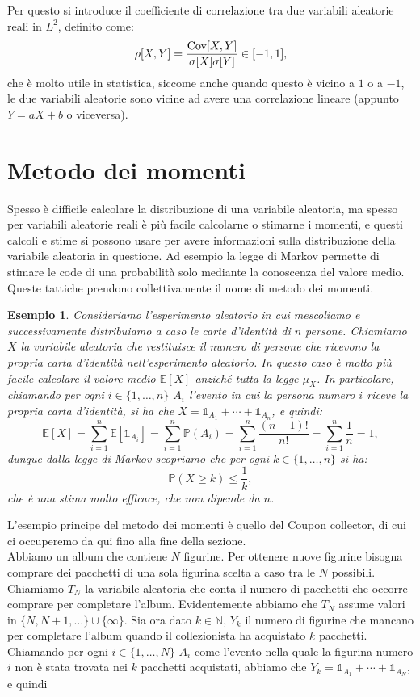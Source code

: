 \documentclass[11pt]{book}
\theoremstyle{Definizione}
\theoremstyle{TeoremaProposizioneLemmaCorollario}
\theoremstyle{OsservazioneNota}
\newtheorem{myes}{Esempio}[section]
\newcommand{\N}{\mathbb{N}}
\renewcommand{\P}{\mathbb{P}}
\newcommand{\E}{\mathbb{E}}
\newcommand{\Cov}{\textup{Cov}}
\newcommand{\uno}[1]{\mathds{1}_{#1}}
\begin{document}
\noindent
Per questo si introduce il coefficiente di correlazione tra due variabili aleatorie reali in $L^2$, definito come:
$$
\rho[X,Y] = \frac{\Cov[X,Y]}{\sigma[X]\sigma[Y]}\in [-1,1],
$$
che è molto utile in statistica, siccome anche quando questo è vicino a $1$ o a $-1$, le due variabili aleatorie sono vicine ad avere una correlazione lineare (appunto $Y = aX+b$ o viceversa).
\section{Metodo dei momenti}
Spesso è difficile calcolare la distribuzione di una variabile aleatoria, ma spesso per variabili aleatorie reali è più facile calcolarne o stimarne i momenti, e questi calcoli e stime si possono usare per avere informazioni sulla distribuzione della variabile aleatoria in questione. Ad esempio la legge di Markov permette di stimare le code di una probabilità solo mediante la conoscenza del valore medio.\\
Queste tattiche prendono collettivamente il nome di metodo dei momenti.
\begin{myes}
Consideriamo l'esperimento aleatorio in cui mescoliamo e successivamente distribuiamo a caso le carte d'identità di $n$ persone. Chiamiamo $X$ la variabile aleatoria che restituisce il numero di persone che ricevono la propria carta d'identità nell'esperimento aleatorio. In questo caso è molto più facile calcolare il valore medio $\E[X]$ anziché tutta la legge $\mu_X$. In particolare, chiamando per ogni $i\in \{1,\dots,n\}$ $A_i$ l'evento in cui la persona numero $i$ riceve la propria carta d'identità, si ha che $X = \uno{A_1}+\cdots+\uno{A_n}$, e quindi:
$$
\E[X] = \sum_{i = 1}^n \E[\uno{A_i}] = \sum_{i = 1}^n \P(A_i) = \sum_{i = 1}^n \frac{(n-1)!}{n!} = \sum_{i = 1}^n \frac{1}{n} = 1,
$$
dunque dalla legge di Markov scopriamo che per ogni $k\in \{1,\dots,n\}$ si ha:
$$
\P(X \geq k) \leq \frac{1}{k},
$$
che è una stima molto efficace, che non dipende da $n$.
\end{myes}
L'esempio principe del metodo dei momenti è quello del Coupon collector, di cui ci occuperemo da qui fino alla fine della sezione.\\
Abbiamo un album che contiene $N$ figurine. Per ottenere nuove figurine bisogna comprare dei pacchetti di una sola figurina scelta a caso tra le $N$ possibili. Chiamiamo $T_N$ la variabile aleatoria che conta il numero di pacchetti che occorre comprare per completare l'album. Evidentemente abbiamo che $T_N$ assume valori in $\{N,N+1,\dots\}\cup \{\infty\}$. Sia ora dato $k\in \N$, $Y_k$ il numero di figurine che mancano per completare l'album quando il collezionista ha acquistato $k$ pacchetti. Chiamando per ogni $i\in \{1,\dots,N\}$ $A_i$ come l'evento nella quale la figurina numero $i$ non è stata trovata nei $k$ pacchetti acquistati, abbiamo che $Y_k = \uno{A_1}+\cdots+\uno{A_N}$, e quindi
\end{document}
